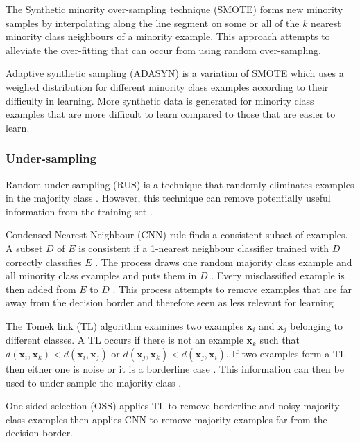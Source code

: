 \documentclass{sig-alternate-05-2015}
\begin{document}
	The Synthetic minority over-sampling technique (SMOTE) \cite{Chawla:2002:SSM:1622407.1622416} forms new minority samples by interpolating along the line segment on some or all of the $k$ nearest minority class neighbours of a minority example. This approach attempts to alleviate the over-fitting that can occur from using random over-sampling.
	
	Adaptive synthetic sampling (ADASYN) \cite{4633969} is a variation of SMOTE which uses a weighed distribution for different minority class examples according to their difficulty in learning. More synthetic data is generated for minority class examples that are more difficult to learn compared to those that are easier to learn.
	
	\subsubsection{Under-sampling}
	Random under-sampling (RUS) is a technique that randomly eliminates examples in the majority class \cite{Batista:2004:SBS:1007730.1007735}. However, this technique can remove potentially useful information from the training set \cite{Batista:2004:SBS:1007730.1007735}. 
	
	Condensed Nearest Neighbour (CNN) rule \cite{1056066} finds a consistent subset of examples. A subset $D$ of $E$ is consistent if a 1-nearest neighbour classifier trained with $D$ correctly classifies $E$ \cite{Batista:2004:SBS:1007730.1007735}. The process draws one random majority class example and all minority class examples and puts them in $D$ \cite{Batista:2004:SBS:1007730.1007735}. Every misclassified example is then added from $E$ to $D$ \cite{Batista:2004:SBS:1007730.1007735}. This process attempts to remove examples that are far away from the decision border and therefore seen as less relevant for learning \cite{Batista:2004:SBS:1007730.1007735}.
	
	The Tomek link (TL) algorithm \cite{4309452} examines two examples $\textbf{x}_i$ and $\textbf{x}_j$ belonging to different classes. A TL occurs if there is not an example $\textbf{x}_k$ such that $d(\textbf{x}_i, \textbf{x}_k) < d(\textbf{x}_i, \textbf{x}_j)$ or $d(\textbf{x}_j, \textbf{x}_k) < d(\textbf{x}_j, \textbf{x}_i)$. If two examples form a TL then either one is noise or it is a borderline case \cite{Batista:2004:SBS:1007730.1007735}. This information can then be used to under-sample the majority class \cite{Batista:2004:SBS:1007730.1007735}.
	
	One-sided selection (OSS) \cite{Kubat97addressingthe} applies TL to remove borderline and noisy majority class examples then applies CNN to remove majority examples far from the decision border.
	
\end{document}
